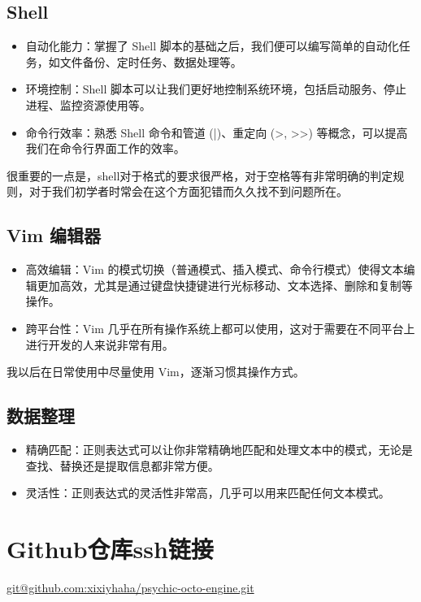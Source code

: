 \documentclass{ctexart}
\begin{document}
\subsection{Shell}
\begin{itemize}
\item 自动化能力：掌握了 Shell 脚本的基础之后，我们便可以编写简单的自动化任务，如文件备份、定时任务、数据处理等。\\
\item 环境控制：Shell 脚本可以让我们更好地控制系统环境，包括启动服务、停止进程、监控资源使用等。\\
\item 命令行效率：熟悉 Shell 命令和管道 (|)、重定向 (>, >>) 等概念，可以提高我们在命令行界面工作的效率。\\
\end{itemize}
很重要的一点是，shell对于格式的要求很严格，对于空格等有非常明确的判定规则，对于我们初学者时常会在这个方面犯错而久久找不到问题所在。\\
\subsection{Vim 编辑器}
\begin{itemize}
    \item 高效编辑：Vim 的模式切换（普通模式、插入模式、命令行模式）使得文本编辑更加高效，尤其是通过键盘快捷键进行光标移动、文本选择、删除和复制等操作。\\
    \item 跨平台性：Vim 几乎在所有操作系统上都可以使用，这对于需要在不同平台上进行开发的人来说非常有用。\\
    \end{itemize}
    我以后在日常使用中尽量使用 Vim，逐渐习惯其操作方式。
\subsection{数据整理}
\begin{itemize}
    \item 精确匹配：正则表达式可以让你非常精确地匹配和处理文本中的模式，无论是查找、替换还是提取信息都非常方便。\\
    \item 灵活性：正则表达式的灵活性非常高，几乎可以用来匹配任何文本模式。\\
    \end{itemize}

\section{Github仓库ssh链接}
 \url {git@github.com:xixiyhaha/psychic-octo-engine.git }
\end{document}
